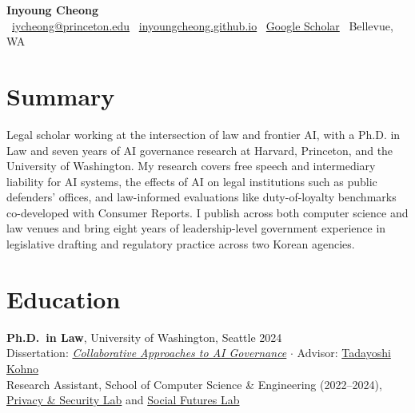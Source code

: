 \documentclass[10pt]{article}
\begin{document}
\begin{center}
{\LARGE\bfseries Inyoung Cheong}\\[4pt]
{\small
\faEnvelope\ \href{mailto:iycheong@princeton.edu}{iycheong@princeton.edu}
\quad\faGlobe\ \href{https://inyoungcheong.github.io}{inyoungcheong.github.io}
\quad\faGraduationCap\ \href{https://scholar.google.com/citations?user=xwZI_jcAAAAJ&hl=en}{Google Scholar}
\quad\faMapMarker*\ Bellevue, WA
}
\end{center}

\vspace{-4pt}

\section*{Summary}
{\small
Legal scholar working at the intersection of law and frontier AI, with a Ph.D. in Law and seven years of AI governance research at Harvard, Princeton, and the University of Washington. My research covers free speech and intermediary liability for AI systems, the effects of AI on legal institutions such as public defenders' offices, and law-informed evaluations like duty-of-loyalty benchmarks co-developed with Consumer Reports. I publish across both computer science and law venues and bring eight years of leadership-level government experience in legislative drafting and regulatory practice across two Korean agencies.
}

\section*{Education}

\textbf{Ph.D.\ in Law}, University of Washington, Seattle \hfill 2024\\
{\small Dissertation: \textit{\href{https://homes.cs.washington.edu/~yoshi/papers/theses/inyoung-cheong-dissertation.pdf}{Collaborative Approaches to AI Governance}} $\cdot$ Advisor: \href{https://gufaculty360.georgetown.edu/s/contact/003UH00000ZmP3HYAV/yoshi-kohno}{Tadayoshi Kohno}\\
Research Assistant, School of Computer Science \& Engineering (2022--2024), \href{https://seclab.cs.washington.edu/}{Privacy \& Security Lab} and \href{https://social.cs.washington.edu/}{Social Futures Lab}}
\end{document}
